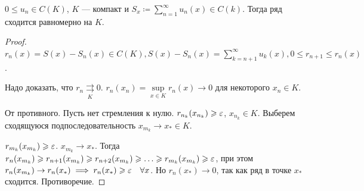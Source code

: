 \begin{theorem}
    $0 \le u_n \in C(K)$, $K$ --- компакт и  $S_x \coloneqq \sum\limits_{n=1}^\infty u_n(x) \in C(k)$. Тогда ряд сходится равномерно на  $K$.
\end{theorem}
\begin{proof}
    $r_n(x) = S(x) - S_n(x) \in C(K), S(x) - S_n(x) = \sum\limits_{k=n+1}^\infty u_k(x), 0 \le r_{n+1} \le r_n(x)$.

    Надо доказать, что $r_n \underset{K}{\rightrightarrows} 0$.  $r_n(x_n) = \sup\limits_{x \in K} r_n(x) \to 0$ для некоторого $x_n \in K$.

    От противного. Пусть нет стремления к нулю.  $r_{n_k}(x_{n_k}) \geqslant \varepsilon$, $x_{n_k} \in K$. Выберем сходящуюся подпоследовательность  $x_{m_k} \to x_* \in K$.

     $r_{m_k}(x_{m_k}) \geqslant \varepsilon$. $x_{m_k} \to x_*$. Тогда  $r_n(x_{m_k}) \geqslant r_{n+1}(x_{m_k}) \geqslant r_{n+2}(x_{m_k}) \geqslant \ldots \geqslant r_{m_k}(x_{m_k}) \geqslant \varepsilon$, при этом $r_n(x_{m_k}) \to r_n(x_*) \implies r_n(x_*) \geqslant \varepsilon \quad \forall x$. Но $r_n(x_*) \to 0$, так как ряд в точке $x_*$ сходится. Противоречие.
\end{proof}

